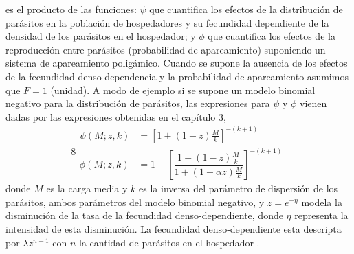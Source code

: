 \documentclass[12pt,a4paper]{article}
\theoremstyle{plain}%
\theoremstyle{definition}
\theoremstyle{remark}
\begin{document}
\begin{itemize}
		es el producto de las funciones: 
		$\psi$ que cuantifica los efectos de la distribución de parásitos en la población de hospedadores y su fecundidad dependiente de la densidad de los parásitos en el hospedador; 
		y $\phi$ que cuantifica los efectos de la reproducción entre parásitos (probabilidad de apareamiento)
		suponiendo un sistema de apareamiento poligámico. 
		Cuando se supone la ausencia de los efectos de la fecundidad denso-dependencia y la probabilidad de apareamiento asumimos que $F=1$ (unidad).
		A modo de ejemplo si se supone un modelo binomial negativo para la distribución de parásitos, las expresiones para $\psi$ y $\phi$ vienen 
		{%
		dadas por las expresiones obtenidas en el capítulo 3,%
		}
		\begin{equation}8
		\begin{split}
		\psi(M;z,k)&=\left[ 1+(1-z) \tfrac{M}{k}\right] ^{-(k+1)}\\
		\phi(M;z,k)&=1-\left[ \dfrac{1+(1-z)\frac{M}{k}}{1+(1-\alpha z)\frac{M}{k}}\right] ^{-(k+1)}
		\end{split}
		\end{equation} 
		donde $M$ es la carga media y $k$ es la inversa del parámetro de dispersión de los parásitos, ambos parámetros del modelo binomial negativo, y $z = e^{-\eta}$ 
		modela la disminución de la tasa de la fecundidad denso-dependiente, donde $\eta$ representa la intensidad de esta disminución.
		La fecundidad denso-dependiente
		esta descripta por $\lambda z^{n-1}$ con $n$ la cantidad de parásitos en el
		hospedador \cite{hall2000geographical}.
		
	\end{itemize}
\end{document}
